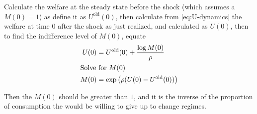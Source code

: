 \documentclass[11pt]{article}
\begin{document}
Calculate the welfare at the steady state before the shock (which assumes a $M(0) = 1$) as define it as $U^{\text{old}}(0)$, then calculate from \cref{eq:U-dynamics} the welfare at time $0$ after the shock as just realized, and calculated as $U(0)$, then to find the indifference level of $M(0)$, equate
\begin{align}
	U(0) &= U^{\text{old}}(0)  + \frac{\log M(0)}{\rho}\\
	\intertext{Solve for $M(0)$}
	M(0) &= \exp \left(\rho(U(0) - U^{\text{old}}(0))\right)
\end{align}

Then the $M(0)$ should be greater than $1$, and it is the inverse of the proportion of consumption the would be willing to give up to change regimes.
\end{document}
